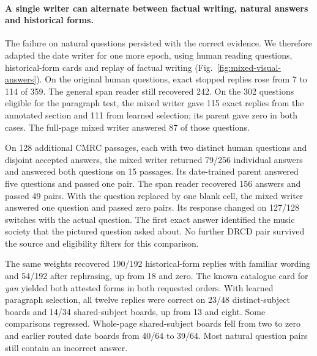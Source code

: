 \paragraph{A single writer can alternate between factual writing, natural answers and historical forms.}
The failure on natural questions persisted with the correct evidence. We therefore adapted the date writer for one more epoch, using human reading questions, historical-form cards and replay of factual writing (Fig.~\ref{fig:mixed-visual-answers}). On the original human questions, exact stopped replies rose from 7 to 114 of 359. The general span reader still recovered 242. On the 302 questions eligible for the paragraph test, the mixed writer gave 115 exact replies from the annotated section and 111 from learned selection; its parent gave zero in both cases. The full-page mixed writer answered 87 of those questions.

On 128 additional CMRC passages, each with two distinct human questions and disjoint accepted answers, the mixed writer returned 79/256 individual answers and answered both questions on 15 passages. Its date-trained parent answered five questions and passed one pair. The span reader recovered 156 answers and passed 49 pairs. With the question replaced by one blank cell, the mixed writer answered one question and passed zero pairs. Its response changed on 127/128 switches with the actual question. The first exact answer identified the music society that the pictured question asked about. No further DRCD pair survived the source and eligibility filters for this comparison.

The same weights recovered 190/192 historical-form replies with familiar wording and 54/192 after rephrasing, up from 18 and zero. The known catalogue card for \textit{yan} yielded both attested forms in both requested orders. With learned paragraph selection, all twelve replies were correct on 23/48 distinct-subject boards and 14/34 shared-subject boards, up from 13 and eight. Some comparisons regressed. Whole-page shared-subject boards fell from two to zero and earlier routed date boards from 40/64 to 39/64. Most natural question pairs still contain an incorrect answer.
